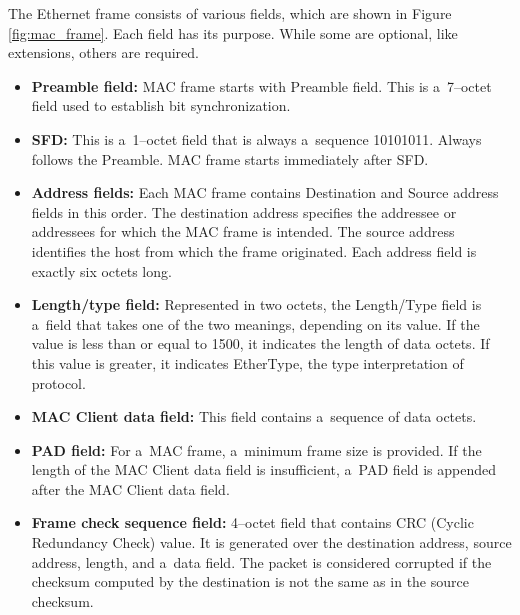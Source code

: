 \documentclass[
  printed,     %
  color,       %
  oneside,     %
  nosansbold,  %
  nocolorbold, %
  nolof,         %
  nolot,         %
]{fithesis4}
\begin{document}
The Ethernet frame consists of various fields, which are shown in Figure \ref{fig:mac_frame}. Each field has its purpose. While some are optional, like extensions, others are required.

\begin{itemize}[noitemsep,topsep=0pt]
    \item \textbf{Preamble field:} MAC frame starts with Preamble field. This is a~7--octet field used to establish bit synchronization.
    \item \textbf{SFD:} This is a~1--octet field that is always a~sequence 10101011. Always follows the Preamble. MAC frame starts immediately after SFD.
    \item \textbf{Address fields:} Each MAC frame contains Destination and Source address fields in this order. The destination address specifies the addressee or addressees for which the MAC frame is intended. The source address identifies the host from which the frame originated. Each address field is exactly six octets long.
    \item \textbf{Length/type field:} Represented in two octets, the Length/Type field is a~field that takes one of the two meanings, depending on its value. If the value is less than or equal to 1500, it indicates the length of data octets. If this value is greater, it indicates EtherType, the type interpretation of protocol.
    \item \textbf{MAC Client data field:} This field contains a~sequence of data octets.
    \item \textbf{PAD field:} For a~MAC frame, a~minimum frame size is provided. If the length of the MAC Client data field is insufficient, a~PAD field is appended after the MAC Client data field.
    \item \textbf{Frame check sequence field:} 4--octet field that contains CRC (Cyclic Redundancy Check) value. It is generated over the destination address, source address, length, and a~data field. The packet is considered corrupted if the checksum computed by the destination is not the same as in the source checksum.
\end{itemize}
\end{document}
